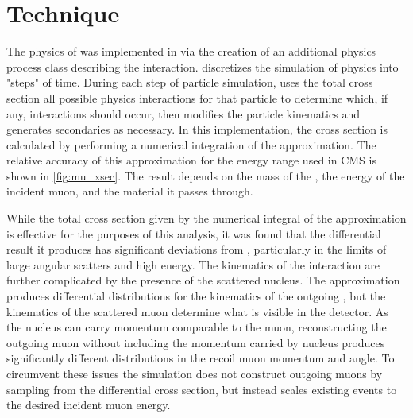 \section{Technique}
\label{sec:technique}

The physics of \dbrem was implemented in \gf via the creation of an additional physics process class describing the interaction. 
\gf discretizes the simulation of physics into "steps" of time. 
During each step of particle simulation, \gf uses the total cross section all possible physics interactions for that particle to determine which, if any, interactions should occur, then modifies the particle kinematics and generates secondaries as necessary. 
In this implementation, the cross section is calculated by performing a numerical integration of the \ww approximation.
The relative accuracy of this approximation for the energy range used in CMS is shown in \cref{fig:mu_xsec}.
The result depends on the mass of the \aprime,  the energy of the incident muon, and the material it passes through. 

While the total cross section given by the numerical integral of the \ww approximation is effective for the purposes of this analysis, it was found that the differential result it produces has significant deviations from \mg, particularly in the limits of large angular scatters and high \aprime energy. 
The kinematics of the interaction are further complicated by the presence of the scattered nucleus. 
The \ww approximation produces differential distributions for the kinematics of the outgoing \aprime, but the kinematics of the scattered muon determine what is visible in the detector. 
As the nucleus can carry momentum comparable to the muon, reconstructing the outgoing muon without including the momentum carried by nucleus produces significantly different distributions in the recoil muon momentum and angle. 
To circumvent these issues the simulation does not construct outgoing muons by sampling from the differential \ww cross section, but instead scales existing \mg events to the desired incident muon energy. 

